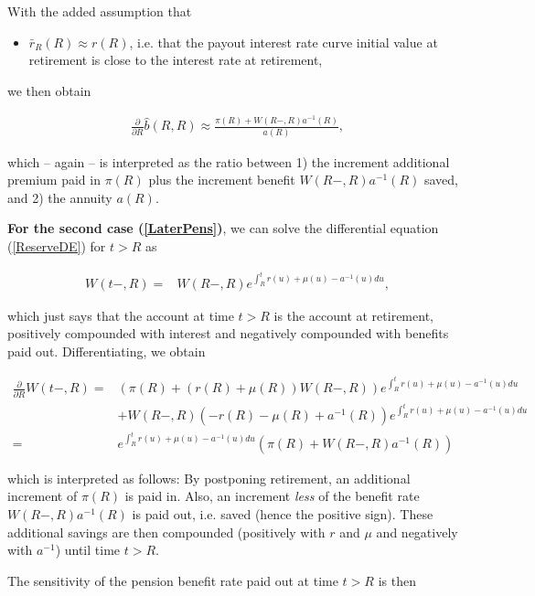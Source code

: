\documentclass{article}
\newcommand{\1}[1]{\mathbbm{1}_{\left\lbrace #1 \right\rbrace}}
\theoremstyle{break}
\theoremstyle{remark}
\numberwithin{equation}{section}
\begin{document}
With the added assumption that

\begin{itemize}
	\item $\bar{r}_R (R) \approx r (R)$, i.e. that the payout interest rate curve initial value at retirement is close to the interest rate at retirement,
\end{itemize}

we then obtain

\begin{align} \label{ResultFirst}
	\frac{\partial}{\partial R} \hat{b}(R,R) \approx \frac{\pi(R) + W(R-,R) a^{-1}(R)}{a(R)},
\end{align}

which -- again -- is interpreted as the ratio between 1) the increment additional premium paid in $\pi(R)$ plus the increment benefit $W(R-,R) a^{-1}(R)$ saved, and 2) the annuity $a(R)$.

\textbf{For the second case (\ref{LaterPens})}, we can solve the differential equation (\ref{ReserveDE}) for $t>R$ as

\begin{align} \label{ReserveAfterRetirement}
	W(t-,R) =& W(R-,R) e^{\int_R^t r(u) + \mu(u) - a^{-1}(u) du},
\end{align}

which just says that the account at time $t>R$ is the account at retirement, positively compounded with interest and negatively compounded with benefits paid out. Differentiating, we obtain

\begin{align*}
	\frac{\partial}{\partial R} W(t-,R) =& \left( \pi(R) + \left(r(R) + \mu(R)\right) W(R-,R) \right) e^{\int_R^t r(u) + \mu(u) - a^{-1}(u) du} \\
	&+ W(R-,R) \left( - r(R) - \mu(R) + a^{-1}(R) \right) e^{\int_R^t r(u) + \mu(u) - a^{-1}(u) du} \\
	=& e^{\int_R^t r(u) + \mu(u) - a^{-1}(u) du} \left( \pi (R) + W(R-,R) a^{-1}(R) \right)
\end{align*}

which is interpreted as follows: By postponing retirement, an additional increment of $\pi(R)$ is paid in. Also, an increment \textit{less} of the benefit rate $W(R-,R) a^{-1}(R)$ is paid out, i.e. saved (hence the positive sign). These additional savings are then compounded (positively with $r$ and $\mu$ and negatively with $a^{-1}$) until time $t>R$.

The sensitivity of the pension benefit rate paid out at time $t>R$ is then
\end{document}
